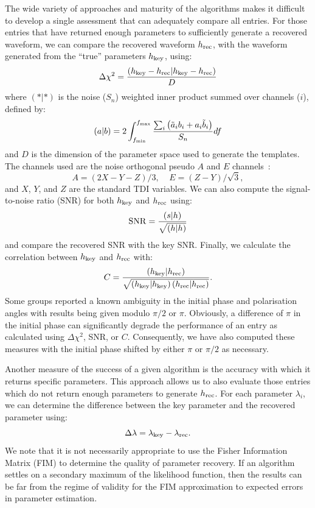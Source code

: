\documentclass[12pt]{iopart}
\begin{document}
The wide variety of approaches and maturity of the algorithms makes it difficult to develop a single assessment that can adequately compare all entries. For those entries that have returned enough parameters to sufficiently generate a recovered waveform, we can compare the recovered waveform $h_{\rm rec}$, with the waveform generated from the ``true'' parameters $h_{\rm key}$, using:
\begin{equation}
\label{deltachi}
\Delta \chi^2 = \frac{\left(h_{\rm key} - h_{\rm rec}|h_{\rm key} - h_{\rm rec}\right)}{D}
\end{equation}
where $(*|*)$ is the noise ($S_n$) weighted inner product summed over channels ($i$), defined by:
\begin{equation}
\left(a|b\right) = 2 \int_{f_{\rm min}}^{f_{\rm max}}{\frac{\sum_{i}{\left(\tilde{a}_ib_i+a_i\tilde{b}_i\right)}}{S_n}df}
\end{equation}
and $D$ is the dimension of the parameter space used to generate the templates. The channels used are the noise orthogonal pseudo $A$ and $E$ channels~\cite{prince02}:
\begin{equation}
A = \left(2X - Y - Z\right)/3,~~~~~E = \left(Z - Y\right)/\sqrt{3},
\end{equation}
and $X$, $Y$, and $Z$ are the standard TDI variables. We can also compute the signal-to-noise ratio (SNR) for both $h_{\rm key}$ and $h_{\rm rec}$ using:
\begin{equation}
\label{snr}
{\rm SNR} = \frac{\left(s|h\right)}{\sqrt{\left(h|h\right)}}
\end{equation}
and compare the recovered SNR with the key SNR. Finally, we calculate the correlation between $h_{\rm key}$ and $h_{\rm rec}$ with:
\begin{equation}
\label{cor}
C = \frac{\left(h_{\rm key}|h_{\rm rec}\right)}{\sqrt{\left(h_{\rm key}|h_{\rm key}\right)\left(h_{\rm rec}|h_{\rm rec}\right)}}.
\end{equation}
Some groups reported a known ambiguity in the initial phase and polarisation angles with results being given modulo $\pi/2$ or $\pi$. Obviously, a difference of $\pi$ in the initial phase can significantly degrade the performance of an entry as calculated using $\Delta\chi^2$, SNR, or $C$. Consequently, we have also computed these measures with the initial phase shifted by either $\pi$ or $\pi/2$ as necessary.

Another measure of the success of a given algorithm is the accuracy with which it returns specific parameters. This approach allows us to also evaluate those entries which do not return enough parameters to generate $h_{\rm rec}$. For each parameter $\lambda_i$, we can determine the difference between the key parameter and the recovered parameter using:
\begin{equation}
\Delta\lambda = \lambda_{\rm key} - \lambda_{\rm rec}.
\end{equation}
We note that it is not necessarily appropriate to use the Fisher Information Matrix (FIM) to determine the quality of parameter recovery. If an algorithm settles on a secondary maximum of the likelihood function, then the results can be far from the regime of validity for the FIM approximation to expected errors in parameter estimation.
\end{document}
